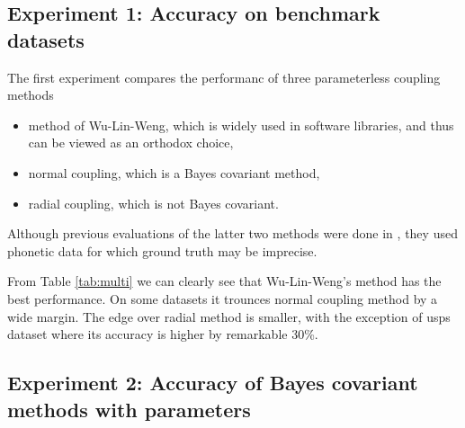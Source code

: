 \documentclass[twoside,11pt]{article}
\begin{document}
\subsection{Experiment 1: Accuracy on benchmark datasets}

The first experiment compares the performanc of three parameterless coupling methods
\begin{itemize}
\item method of Wu-Lin-Weng, which is widely used in software libraries, and thus can be viewed as an orthodox choice,
\item normal coupling, which is a Bayes covariant method,
\item radial coupling, which is not Bayes covariant.
\end{itemize}

Although previous evaluations of the latter two methods were done in \cite{vsuch2016bayes}, they used phonetic data for which ground truth may be imprecise. 



From Table \ref{tab:multi} we can clearly see that Wu-Lin-Weng's method has the best performance. On some datasets it trounces normal coupling method by a wide margin. The edge over radial method is smaller, with the exception of usps dataset where its accuracy is higher by remarkable 30\%. 



\subsection{Experiment 2: Accuracy of Bayes covariant methods with parameters}








%


\end{document}
